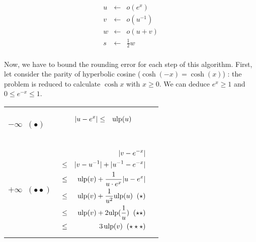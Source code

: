 \documentclass[12pt]{amsart}
\def\ulp{{\rm ulp}}
\begin{document}
\begin{eqnarray}\nonumber
u&\leftarrow&o(e^x)\\\label{coshalgo1}
v&\leftarrow&o({u}^{-1})\\\label{coshalgo2}
w&\leftarrow&o(u+v)\\\label{coshalgo3}
s&\leftarrow&\frac{1}{2} w\\\label{coshalgo4}
\end{eqnarray}

Now, we have to bound the rounding error for each step of this
algorithm.  First, let consider the parity of hyperbolic cosine
($\cosh(-x)=\cosh(x)$) : the problem is reduced to calculate $\cosh x$
with $x \geq 0$. We can deduce $e^x \geq 1$ and $0 \leq e^{-x} \leq
1$.



\begin{center}
\begin{tabular}{l|l |l}

\begin{minipage}{2.5cm}


${\textnormal{error}}(u)$


$u \leftarrow o(e^x)$\\
$-\infty \;\; (\bullet)$

\end{minipage} &
\begin{minipage}{7.5cm}

\begin{eqnarray}\nonumber
  |u-e^x| &\leq& \ulp(u)\\\nonumber
\end{eqnarray}

\end{minipage} &
\begin{minipage}{6cm}
{\hspace{7cm}}
\end{minipage}\\\hline
\begin{minipage}{2.5cm}
${\textnormal{error}}(v)$


$v \leftarrow o({u}^{-1}) $\\
$+\infty \;\; (\bullet\bullet)$ 
\end{minipage} &
\begin{minipage}{7.5cm}



\begin{eqnarray}\nonumber
  &&|v-e^{-x}| \\\nonumber
  &       \leq&  |v - u^{-1}| +  |u^{-1}  - e^{-x}|\\\nonumber
  &       \leq& \ulp(v) + \frac{1}{u \cdot e^x} |u-e^{x}|\\\nonumber
  &       \leq& \ulp(v) + \frac{1}{u^2} \ulp(u)\;\;(\star)\\\nonumber
  &       \leq& \ulp(v) + 2 \ulp(\frac{1}{u})\;\;(\star\star)\\\nonumber
  &       \leq& 3 \, \ulp(v)\;\;(\star\star\star)
\end{eqnarray}



\end{minipage}
\end{tabular}
\end{center}
\end{document}

